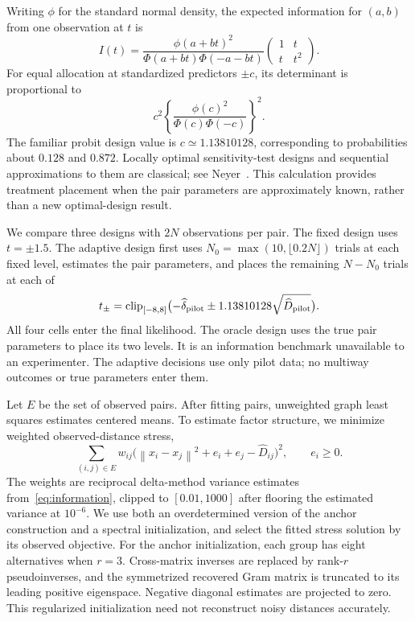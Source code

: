 \documentclass[11pt]{amsart}
\theoremstyle{definition}\newtheorem{example}[theorem]{Example}
\theoremstyle{remark}\newtheorem{remark}[theorem]{Remark}
\newcommand{\norm}[1]{\left\lVert#1\right\rVert}
\begin{document}
Writing $\phi$ for the standard normal density, the expected information for $(a,b)$ from one observation at $t$ is
\begin{equation}\label{eq:information}
 I(t)=\frac{\phi(a+bt)^2}{\Phi(a+bt)\Phi(-a-bt)}
 \begin{pmatrix}1&t\\t&t^2\end{pmatrix}.
\end{equation}
For equal allocation at standardized predictors $\pm c$, its determinant is proportional to
\[
 c^2\left\{\frac{\phi(c)^2}{\Phi(c)\Phi(-c)}\right\}^2.
\]
The familiar probit design value is $c\simeq1.13810128$, corresponding to probabilities about $0.128$ and $0.872$. Locally optimal sensitivity-test designs and sequential approximations to them are classical; see Neyer~\cite{neyer1994}. This calculation provides treatment placement when the pair parameters are approximately known, rather than a new optimal-design result.

We compare three designs with $2N$ observations per pair. The fixed design uses $t=\pm1.5$. The adaptive design first uses $N_0=\max(10,\lfloor0.2N\rfloor)$ trials at each fixed level, estimates the pair parameters, and places the remaining $N-N_0$ trials at each of
\[
 t_\pm=\operatorname{clip}_{[-8,8]}
 \bigl(-\widehat\delta_{\rm pilot}\pm1.13810128\sqrt{\widehat D_{\rm pilot}}\bigr).
\]
All four cells enter the final likelihood. The oracle design uses the true pair parameters to place its two levels. It is an information benchmark unavailable to an experimenter. The adaptive decisions use only pilot data; no multiway outcomes or true parameters enter them.

Let $E$ be the set of observed pairs. After fitting pairs, unweighted graph least squares estimates centered means. To estimate factor structure, we minimize weighted observed-distance stress,
\begin{equation}\label{eq:stress}
 \sum_{(i,j)\in E}w_{ij}
 \bigl(\norm{x_i-x_j}^2+e_i+e_j-\widehat D_{ij}\bigr)^2,
 \qquad e_i\geq0.
\end{equation}
The weights are reciprocal delta-method variance estimates from~\eqref{eq:information}, clipped to $[0.01,1000]$ after flooring the estimated variance at $10^{-6}$. We use both an overdetermined version of the anchor construction and a spectral initialization, and select the fitted stress solution by its observed objective. For the anchor initialization, each group has eight alternatives when $r=3$. Cross-matrix inverses are replaced by rank-$r$ pseudoinverses, and the symmetrized recovered Gram matrix is truncated to its leading positive eigenspace. Negative diagonal estimates are projected to zero. This regularized initialization need not reconstruct noisy distances accurately.
\end{document}
